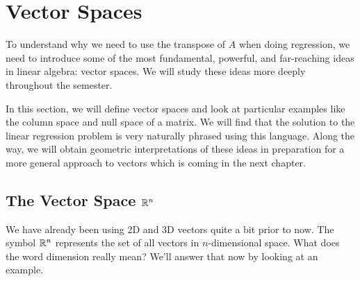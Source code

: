 \section{Vector Spaces}
\label{sec:vector-spaces-why}

To understand why we need to use the transpose of $A$ when doing regression, we need to introduce some of the most fundamental, powerful, and far-reaching ideas in linear algebra: vector spaces.  We will study these ideas more deeply throughout the semester.
 
In this section, we will define vector spaces and look at particular examples like the column space and null space of a matrix.  We will find that the solution to the linear regression problem is very naturally phrased using this language.  Along the way, we will obtain geometric interpretations of these ideas in preparation for a more general approach to vectors which is coming in the next chapter.

\subsection{The Vector Space ${\mathbb{R}}^n$}

We have already been using 2D and 3D vectors quite a bit prior to now.  The symbol $\mathbb{R}^n$ represents the set of all vectors in $n$-dimensional space.  What does the word dimension really mean? We'll answer that now by looking at an example.

